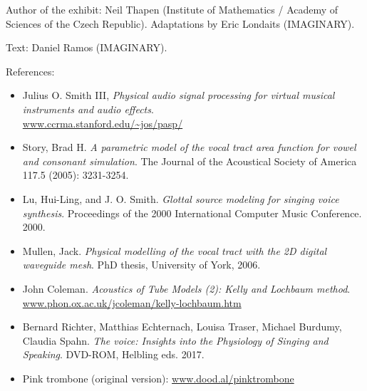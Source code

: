 \begin{sectcredits}

\item[Author of the exhibit:] Neil Thapen (Institute of Mathematics / Academy of Sciences of the Czech Republic). Adaptations by Eric Londaits (IMAGINARY).

\item[Text:] Daniel Ramos (IMAGINARY).

\item[References:] \strut 
\noindent \begin{itemize}[leftmargin=*]
\item Julius O. Smith III, \emph{Physical audio signal processing for virtual musical instruments and audio effects}. \\\url{www.ccrma.stanford.edu/~jos/pasp/}

\item Story, Brad H. \emph{A parametric model of the vocal tract area function for vowel and consonant simulation}. The Journal of the Acoustical Society of America 117.5 (2005): 3231-3254.

\item Lu, Hui-Ling, and J. O. Smith. \emph{Glottal source modeling for singing voice synthesis}. Proceedings of the 2000 International Computer Music Conference. 2000.

\item Mullen, Jack. \emph{Physical modelling of the vocal tract with the 2D digital waveguide mesh}. PhD thesis, University of York, 2006.

\item John Coleman. \emph{Acoustics of Tube Models (2): Kelly and Lochbaum method}. \\
\url{www.phon.ox.ac.uk/jcoleman/kelly-lochbaum.htm}

\item Bernard Richter, Matthias Echternach, Louisa Traser, Michael Burdumy, Claudia Spahn. \emph{The voice: Insights into the Physiology of Singing and Speaking}. DVD-ROM, Helbling eds. 2017.

\item Pink trombone (original version): \url{www.dood.al/pinktrombone}
\end{itemize}

\end{sectcredits}

